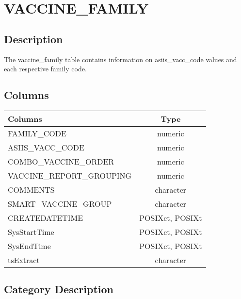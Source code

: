 \documentclass[
  letterpaper,
  DIV=11,
  numbers=noendperiod]{scrreprt}
\begin{document}
\hypertarget{vaccine_family}{%
\chapter*{VACCINE\_FAMILY}\label{vaccine_family}}

\hypertarget{description-46}{%
\section*{Description}\label{description-46}}

The vaccine\_family table contains information on asiis\_vacc\_code
values and each respective family code.

\hypertarget{columns-46}{%
\section*{Columns}\label{columns-46}}

\begin{longtable}{lc}
\toprule
Columns & Type \\ 
\midrule
FAMILY\_CODE & numeric \\ 
ASIIS\_VACC\_CODE & numeric \\ 
COMBO\_VACCINE\_ORDER & numeric \\ 
VACCINE\_REPORT\_GROUPING & numeric \\ 
COMMENTS & character \\ 
SMART\_VACCINE\_GROUP & character \\ 
CREATEDATETIME & POSIXct, POSIXt \\ 
SysStartTime & POSIXct, POSIXt \\ 
SysEndTime & POSIXct, POSIXt \\ 
tsExtract & character \\ 
\bottomrule
\end{longtable}

\hypertarget{category-description-46}{%
\section*{Category Description}\label{category-description-46}}
\end{document}
